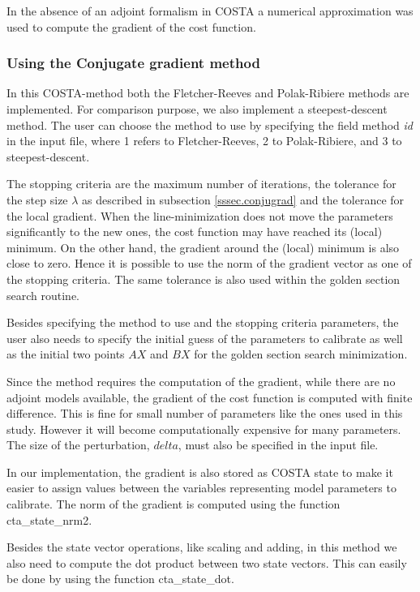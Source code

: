 \documentclass[a4paper,12pt]{article}
\begin{document}
In the absence of an adjoint formalism in COSTA a numerical approximation
was used to compute the gradient of the cost function.


\subsubsection{Using the Conjugate gradient method}
In this COSTA-method both the Fletcher-Reeves and Polak-Ribiere methods are
implemented. For comparison purpose, we also implement a steepest-descent
method. The user can choose the method to use by specifying the field
method \emph{id} in the input file, where 1 refers to Fletcher-Reeves, 2 to
Polak-Ribiere, and 3 to steepest-descent.

The stopping criteria are the maximum number of iterations, the tolerance
for the step size $\lambda$ as described in subsection
\ref{sssec.conjugrad} and the tolerance for the local gradient. When the
line-minimization does not move the parameters significantly to the new
ones, the cost function may have reached its (local) minimum. On the other
hand, the gradient around the (local) minimum is also close to zero. Hence
it is possible to use the norm of the gradient vector as one of the
stopping criteria. The same tolerance is also used within the golden
section search routine.

Besides specifying the method to use and the stopping criteria parameters,
the user also needs to specify the initial guess of the parameters to
calibrate as well as the initial two points $AX$ and $BX$ for the golden
section search minimization.

Since the method requires the computation of the gradient, while there are no
adjoint models available, the gradient of the cost function is computed
with finite difference. This is fine for small number of parameters like
the ones used in this study. However it will become computationally
expensive for many parameters. The size of the perturbation, $delta$, must
also be specified in the input file.

In our implementation, the gradient is also stored as COSTA state to make
it easier to assign values between the variables representing model
parameters to calibrate. The norm of the gradient is computed using the
function cta\_state\_nrm2.

Besides the state vector operations, like scaling and adding, in this
method we also need to compute the dot product between two state vectors.
This can easily be done by using the function cta\_state\_dot.
\end{document}
